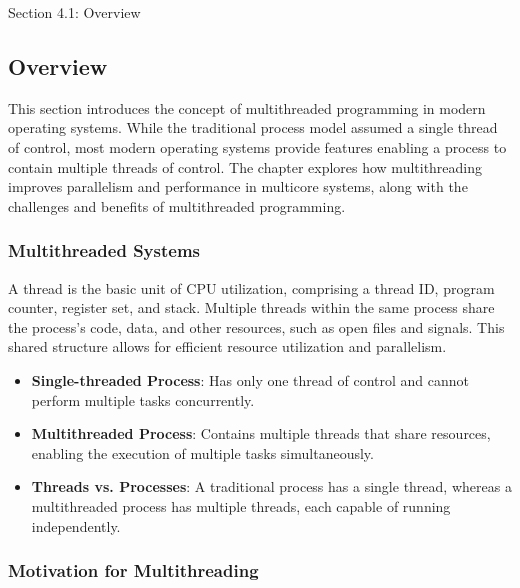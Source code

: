 \begin{notes}{Section 4.1: Overview}
    \subsection*{Overview}

    This section introduces the concept of multithreaded programming in modern operating systems. While the traditional process model assumed a single thread of control, most modern operating systems 
    provide features enabling a process to contain multiple threads of control. The chapter explores how multithreading improves parallelism and performance in multicore systems, along with the challenges 
    and benefits of multithreaded programming.
    
    \subsubsection*{Multithreaded Systems}
    
    A thread is the basic unit of CPU utilization, comprising a thread ID, program counter, register set, and stack. Multiple threads within the same process share the process's code, data, and other 
    resources, such as open files and signals. This shared structure allows for efficient resource utilization and parallelism.
    
    \begin{highlight}
    
        \begin{itemize}
            \item \textbf{Single-threaded Process}: Has only one thread of control and cannot perform multiple tasks concurrently.
            \item \textbf{Multithreaded Process}: Contains multiple threads that share resources, enabling the execution of multiple tasks simultaneously.
            \item \textbf{Threads vs. Processes}: A traditional process has a single thread, whereas a multithreaded process has multiple threads, each capable of running independently.
        \end{itemize}
    
    \end{highlight}
    
    \subsubsection*{Motivation for Multithreading}
    

\end{notes}
